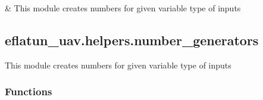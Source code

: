 \documentclass[letterpaper,10pt,english]{sphinxmanual}
\begin{document}
\begin{savenotes}\sphinxattablestart
\sphinxthistablewithglobalstyle
\sphinxthistablewithnovlinesstyle
\centering
\begin{tabulary}{\linewidth}[t]{}
\sphinxtoprule
\sphinxtableatstartofbodyhook
\sphinxAtStartPar
{\hyperref[\detokenize{generated/eflatun_uav.helpers.number_generators:module-eflatun_uav.helpers.number_generators}]{}}
&
\sphinxAtStartPar
This module creates numbers for given variable type of inputs
\\
\sphinxbottomrule
\end{tabulary}
\sphinxtableafterendhook\par
\sphinxattableend\end{savenotes}

\sphinxstepscope


\subsection{eflatun\_uav.helpers.number\_generators}
\label{\detokenize{generated/eflatun_uav.helpers.number_generators:module-eflatun_uav.helpers.number_generators}}\label{\detokenize{generated/eflatun_uav.helpers.number_generators:eflatun-uav-helpers-number-generators}}\label{\detokenize{generated/eflatun_uav.helpers.number_generators::doc}}
\sphinxAtStartPar
This module creates numbers for given variable type of inputs
\subsubsection*{Functions}
\end{document}
